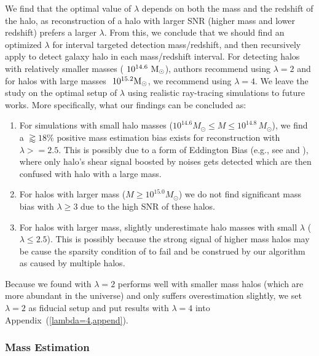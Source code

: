 \documentclass[twocolumn, usenames, dvipsnames]{aastex63}
\begin{document}
We find that the optimal value of $\lambda$ depends on both the mass and the
redshift of the halo, as reconstruction of a halo with larger SNR (higher mass
and lower redshift) prefers a larger $\lambda$. From this, we conclude that we
should find an optimized $\lambda$ for interval targeted detection
mass/redshift, and then recursively apply \splinv{} to detect galaxy halo in
each mass/redshift interval. For detecting halos with relatively smaller masses
($~10^{14.6}~\textup{M}_\odot$), authors recommend using $\lambda = 2$ and for
halos with large masses $~10^{15.2}\textup{M}_\odot$, we recommend using
$\lambda=4$. We leave the study on the optimal setup of $\lambda$ using
realistic ray-tracing simulations \citep{raytracingTakahashi2017} to future
works. More specifically, what our findings can be concluded as:
\begin{enumerate}
    \item For simulations with small halo masses ($10^{14.6} M_\odot \leq M\leq
        10^{14.8}\,M_\odot$), we find a $\gtrapprox 18\%$ positive mass estimation bias
        exists for reconstruction with $\lambda>=2.5$. This is possibly due to
        a form of Eddington Bias (e.g., see \cite{Kelly:2007jy} and
        \cite{Eddington1913}), where only halo's shear signal boosted by noises
        gets detected which are then confused with halo with a large mass.
    \item For halos with larger mass ($M\geq 10^{15.0} M_{\odot}$) we do not
        find significant mass bias with $\lambda\geq 3$ due to the high SNR of
        these halos.
    \item For halos with larger mass, \splinv{} slightly underestimate halo
        masses with small $\lambda$ ($\lambda \leq 2.5$). This is possibly
        because the strong signal of higher mass halos may be cause the
        sparsity condition of \splinv{} to fail and be construed by our
        algorithm as caused by multiple halos.
\end{enumerate}

Because we found \splinv{} with $\lambda=2$ performs well with smaller mass
halos (which are more abundant in the universe) and only suffers overestimation
slightly, we set $\lambda =2$ as fiducial setup and put results with $\lambda =
4$ into Appendix~(\ref{lambda=4,append}).

\subsubsection{Mass Estimation}
\label{sec:oneHalo_noisy_mass}
\end{document}
